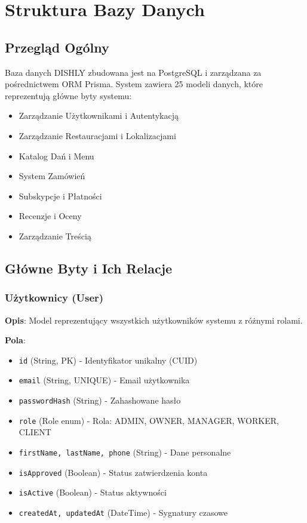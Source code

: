 \documentclass[12pt,a4paper,utf-8]{article}
\begin{document}
\newpage

\section{Struktura Bazy Danych}

\subsection{Przegląd Ogólny}

Baza danych DISHLY zbudowana jest na PostgreSQL i zarządzana za pośrednictwem ORM Prisma. System zawiera 25 modeli danych, które reprezentują główne byty systemu:

\begin{itemize}
    \item Zarządzanie Użytkownikami i Autentykacją
    \item Zarządzanie Restauracjami i Lokalizacjami
    \item Katalog Dań i Menu
    \item System Zamówień
    \item Subskypcje i Płatności
    \item Recenzje i Oceny
    \item Zarządzanie Treścią
\end{itemize}

\subsection{Główne Byty i Ich Relacje}

\subsubsection{Użytkownicy (User)}

\textbf{Opis}: Model reprezentujący wszystkich użytkowników systemu z różnymi rolami.

\textbf{Pola}:
\begin{itemize}
    \item \texttt{id} (String, PK) - Identyfikator unikalny (CUID)
    \item \texttt{email} (String, UNIQUE) - Email użytkownika
    \item \texttt{passwordHash} (String) - Zahashowane hasło
    \item \texttt{role} (Role enum) - Rola: ADMIN, OWNER, MANAGER, WORKER, CLIENT
    \item \texttt{firstName, lastName, phone} (String) - Dane personalne
    \item \texttt{isApproved} (Boolean) - Status zatwierdzenia konta
    \item \texttt{isActive} (Boolean) - Status aktywności
    \item \texttt{createdAt, updatedAt} (DateTime) - Sygnatury czasowe
\end{itemize}
\end{document}
